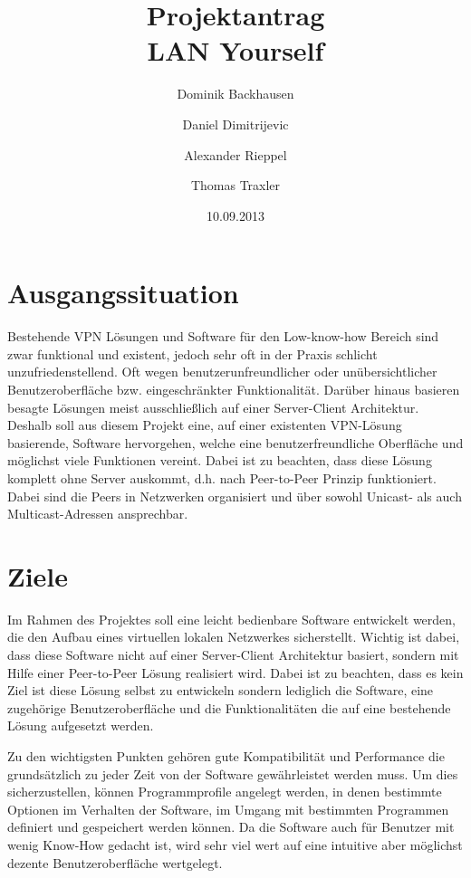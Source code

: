 \documentclass[a4paper,12pt]{scrreprt}
\begin{document}
\author{Dominik Backhausen\and Daniel Dimitrijevic\and Alexander Rieppel\and Thomas Traxler}
\title{Projektantrag\\ LAN Yourself}
\date{10.09.2013}
\maketitle

\section*{Ausgangssituation}
Bestehende VPN Lösungen und Software für den Low-know-how Bereich sind zwar funktional und existent, jedoch sehr oft in der Praxis schlicht unzufriedenstellend. Oft wegen benutzerunfreundlicher oder unübersichtlicher Benutzeroberfläche bzw. eingeschränkter Funktionalität. Darüber hinaus basieren besagte Lösungen meist ausschließlich auf einer Server-Client Architektur. Deshalb soll aus diesem Projekt eine, auf einer existenten VPN-Lösung basierende, Software hervorgehen, welche eine benutzerfreundliche Oberfläche und möglichst viele Funktionen vereint. Dabei ist zu beachten, dass diese Lösung komplett ohne Server auskommt, d.h. nach Peer-to-Peer Prinzip funktioniert. Dabei sind die Peers in Netzwerken organisiert und über sowohl Unicast- als auch Multicast-Adressen ansprechbar.



\section*{Ziele}

	Im Rahmen des Projektes soll eine leicht bedienbare Software entwickelt werden, die den Aufbau eines virtuellen lokalen Netzwerkes sicherstellt. Wichtig ist dabei, dass diese Software nicht auf einer Server-Client Architektur basiert, sondern mit Hilfe einer Peer-to-Peer Lösung realisiert wird. Dabei ist zu beachten, dass es kein Ziel ist diese Lösung selbst zu entwickeln sondern lediglich die Software, eine zugehörige Benutzeroberfläche und die Funktionalitäten die auf eine bestehende Lösung aufgesetzt werden.
	
	Zu den wichtigsten Punkten gehören gute Kompatibilität und Performance die grundsätzlich zu jeder Zeit von der Software gewährleistet werden muss. Um dies sicherzustellen, können Programmprofile angelegt werden, in denen bestimmte Optionen im Verhalten der Software, im Umgang mit bestimmten Programmen definiert und gespeichert werden können. Da die Software auch für Benutzer mit wenig Know-How gedacht ist, wird sehr viel wert auf eine intuitive aber möglichst dezente Benutzeroberfläche wertgelegt. 
	
\end{document}

